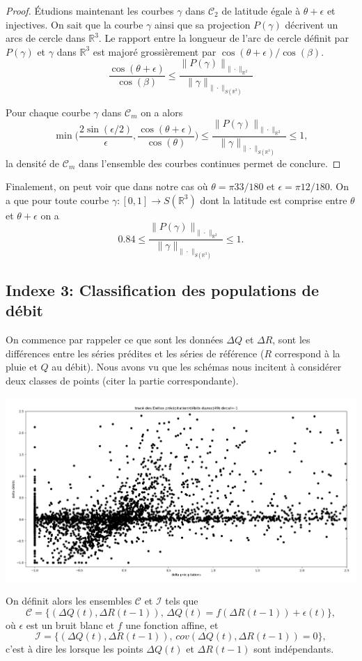 \documentclass[a4paper,10pt]{article}
\begin{document}
\begin{proof}
		Étudions maintenant les courbes $\gamma$ dans $\mathcal{C}_2$ de latitude égale à $\theta+\epsilon$ et injectives. On sait que la courbe $\gamma$ ainsi que sa projection $P(\gamma)$ décrivent un arcs de cercle dans $\mathbb{R}^3$. Le rapport entre la longueur de l'arc de cercle définit par $P(\gamma)$ et $\gamma$ dans $\mathbb{R}^3$ est majoré grossièrement par $\cos(\theta+\epsilon)/\cos(\beta)$.
		\[\frac{\cos(\theta+\epsilon)}{\cos(\beta)}\leq\frac{\|P(\gamma)\|_{\|\cdot\|_{\mathbb{R}^2}}}{\|\gamma\|_{\|\cdot\|_{S(\mathbb{R}^3)}}}\]
		
		Pour chaque courbe $\gamma$ dans $\mathcal{C}_m$ on a alors 
		\[\min\Big(\frac{2\sin(\epsilon/2)}{\epsilon},\frac{\cos(\theta+\epsilon)}{\cos(\theta)} \Big)\leq \frac{\|P(\gamma)\|_{\|\cdot\|_{\mathbb{R}^2}}}{\|\gamma\|_{\|\cdot\|_{S(\mathbb{R}^3)}}} \leq 1,\]
		la densité de $\mathcal{C}_m$ dans l'ensemble des courbes continues permet de conclure.
	\end{proof}
	
	Finalement, on peut voir que dans notre cas où $\theta=\pi 33/180$ et $\epsilon=\pi 12/180$. On a que pour toute courbe $\gamma:[0,1]\to S(\mathbb{R}^3)$ dont la latitude est comprise entre $\theta$ et $\theta+\epsilon$ on a
	\[0.84\leq \frac{\|P(\gamma)\|_{\|\cdot\|_{\mathbb{R}^2}}}{\|\gamma\|_{\|\cdot\|_{S(\mathbb{R}^3)}}} \leq 1.\]
	
	\subsection{Indexe 3: Classification des populations de débit}
	On commence par rappeler ce que sont les données $\Delta Q$ et $\Delta R$, sont les différences entre les séries prédites et les séries de référence ($R$ correspond à la pluie et $Q$ au débit). Nous avons vu  que les schémas nous incitent à considérer deux classes de points (citer la partie correspondante).
	
	\begin{center}
		\includegraphics[scale=0.28]{images/deb_prec_dec1.png}
	\end{center}
	On définit alors les ensembles $\mathcal{C}$ et $\mathcal{I}$ tels que
	\[\mathcal{C}=\{(\Delta Q(t),\Delta R(t-1)), \, \Delta Q(t)= f(\Delta R(t-1))+\epsilon(t)\},\]
	où $\epsilon$ est un bruit blanc et $f$ une fonction affine, et
	\[\mathcal{I}= \{(\Delta Q(t),\Delta R(t-1)), \, cov(\Delta Q(t),\Delta R(t-1))=0\},\]
	c'est à dire les lorsque les points $\Delta Q(t)$ et $\Delta R(t-1)$ sont indépendants.  
	
\end{document}
